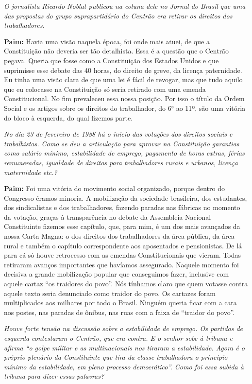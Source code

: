 \emph{O jornalista Ricardo Noblat publicou na coluna dele no Jornal do
Brasil que uma das propostas do grupo suprapartidário do Centrão era
retirar os direitos dos trabalhadores.}

\textbf{Paim:} Havia uma visão naquela época, foi onde mais atuei, de
que a Constituição não deveria ser tão detalhista. Essa é a questão que
o Centrão pegava. Queria que fosse como a Constituição dos Estados
Unidos e que suprimisse esse debate das 40 horas, do direito de greve,
da licença paternidade. Eu tinha uma visão clara de que uma lei é fácil
de revogar, mas que tudo aquilo que eu colocasse na Constituição só
seria retirado com uma emenda Constitucional. No fim prevaleceu essa
nossa posição. Por isso o título da Ordem Social e os artigos sobre os
direitos do trabalhador, do 6° ao 11º, são uma vitória do bloco à
esquerda, do qual fizemos parte.

\emph{No dia 23 de fevereiro de 1988 há o inicio das votações dos
direitos sociais e trabalhistas. Como se deu a articulação para aprovar
na Constituição garantias como salário mínimo, estabilidade de emprego,
pagamento de horas extras, férias remuneradas, igualdade de direitos
para trabalhadores rurais e urbanos, licença maternidade etc.?}

\textbf{Paim:} Foi uma vitória do movimento social organizado, porque
dentro do Congresso éramos minoria. A mobilização da sociedade
brasileira, dos estudantes, dos sindicalistas e dos trabalhadores,
fazendo paradas nas fábricas no momento da votação, graças à
transparência no debate da Assembleia Nacional Constituinte fizemos esse
capítulo, que, para mim, é um dos mais avançados da nossa Carta Magna: o
dos direitos dos trabalhadores da área pública, da área rural e também o
capítulo correspondente aos aposentados e pensionistas. De lá para cá só
houve retrocesso com as emendas Constitucionais que vieram. Todas
retiraram avanços importantes que havíamos assegurado. Naquele momento
foi decisiva a grande mobilização popular que conseguimos fazer,
inclusive com aquele cartaz ``os traidores do povo''. Nós tínhamos claro
que quem votasse contra aquele texto seria denunciado como traidor do
povo. Os cartazes foram multiplicados aos milhares por todo o Brasil.
Ninguém queria ficar com a cara nos postes, nas paradas de ônibus, nas
ruas com a faixa de ``traidor do povo''.

\emph{Houve forte tensão na discussão sobre a estabilidade de emprego.
Os partidos de esquerda contestaram o Centrão, que era contra. E o
senhor sobe à tribuna e afirma ``o golpe militar e as multinacionais nos
tiraram a estabilidade. Agora é o próprio plenário da Constituinte que
tira da classe trabalhadora o princípio mínimo da estabilidade, em pleno
processo democrático''. Como foi essa subida à tribuna para dizer essas
palavras?}

